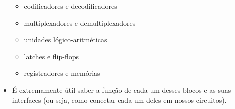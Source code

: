 \documentclass{beamer}
\begin{document}
\begin{frame}
\begin{itemize}
\begin{itemize}
\pause
\item codificadores e decodificadores
\pause
\item multiplexadores e demultiplexadores
\pause
\item unidades lógico-aritméticas
\pause
\item latches e flip-flops
\pause
\item registradores e memórias
\end{itemize}
\pause
\item É extremamente útil saber a função de cada um desses blocos
e as suas interfaces (ou seja, como conectar cada um deles em
nossos circuitos).
\end{itemize}
\end{frame}

\end{document}
